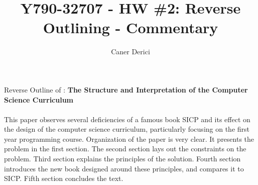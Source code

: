 \documentclass{article}
\title{Y790-32707 - HW \#2: Reverse Outlining - Commentary}
\author{}
\date{Caner Derici}
\begin{document}

\maketitle



\begin{center}
  Reverse Outline of : \textbf{The Structure and Interpretation of the Computer Science Curriculum \cite{sicc2004}}
\end{center}










\paragraph{} This paper observes several deficiencies of a famous book SICP and its
effect on the design of the computer science curriculum, particularly
focusing on the first year programming course. Organization of the
paper is very clear. It presents the problem in the first section. The
second section lays out the constraints on the problem. Third section
explains the principles of the solution. Fourth section introduces the
new book designed around these principles, and compares it to
SICP. Fifth section concludes the text.
\end{document}
